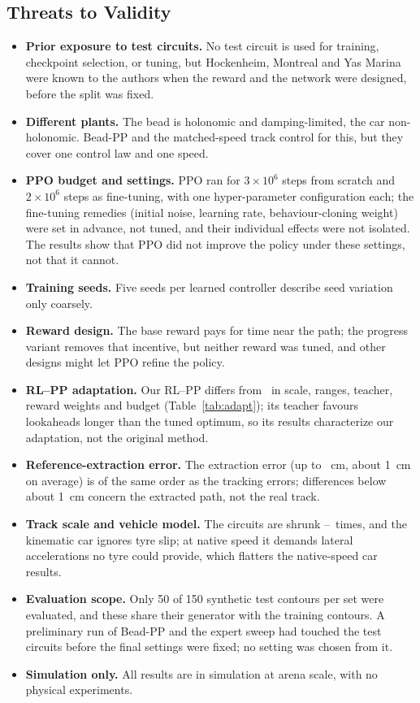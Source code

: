 \documentclass[conference]{IEEEtran}
\begin{document}
\subsection{Threats to Validity}
\begin{itemize}
\item \textbf{Prior exposure to test circuits.} No test circuit is used for training, checkpoint selection, or tuning, but Hockenheim, Montreal and Yas Marina were known to the authors when the reward and the network were designed, before the split was fixed.
\item \textbf{Different plants.} The bead is holonomic and damping-limited, the car non-holonomic. Bead-PP and the matched-speed track control for this, but they cover one control law and one speed.
\item \textbf{PPO budget and settings.} PPO ran for $3\times10^6$ steps from scratch and $2\times10^6$ steps as fine-tuning, with one hyper-parameter configuration each; the fine-tuning remedies (initial noise, learning rate, behaviour-cloning weight) were set in advance, not tuned, and their individual effects were not isolated. The results show that PPO did not improve the policy under these settings, not that it cannot.
\item \textbf{Training seeds.} Five seeds per learned controller describe seed variation only coarsely.
\item \textbf{Reward design.} The base reward pays for time near the path; the progress variant removes that incentive, but neither reward was tuned, and other designs might let PPO refine the policy.
\item \textbf{RL--PP adaptation.} Our RL--PP differs from~\cite{elgouhary2026} in scale, ranges, teacher, reward weights and budget (Table~\ref{tab:adapt}); its teacher favours lookaheads longer than the tuned optimum, so its results characterize our adaptation, not the original method.
\item \textbf{Reference-extraction error.} The extraction error (up to \VextMax~cm, about 1~cm on average) is of the same order as the tracking errors; differences below about 1~cm concern the extracted path, not the real track.
\item \textbf{Track scale and vehicle model.} The circuits are shrunk \VscaleLo--\VscaleHi\ times, and the kinematic car ignores tyre slip; at native speed it demands lateral accelerations no tyre could provide, which flatters the native-speed car results.
\item \textbf{Evaluation scope.} Only 50 of 150 synthetic test contours per set were evaluated, and these share their generator with the training contours. A preliminary run of Bead-PP and the expert sweep had touched the test circuits before the final settings were fixed; no setting was chosen from it.
\item \textbf{Simulation only.} All results are in simulation at arena scale, with no physical experiments.
\end{itemize}
\end{document}
